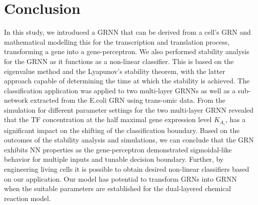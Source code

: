 \documentclass[twocolumn]{biophys-new}
\begin{document}
{{\section*{Conclusion} \label{conclusion}
In this study, we introduced a GRNN that can be derived from a cell's GRN and mathematical modelling this for the transcription and translation process, transforming a gene into a gene-perceptron. We also performed stability analysis for the GRNN as it functions as a non-linear classifier. This is based on the eigenvalue method and the Lyapunov's stability theorem, with the latter approach capable of determining the time at which the stability is achieved. 
The classification application was applied to two multi-layer GRNNs as well as a sub-network extracted from the E.coli GRN using trans-omic data. 
From the simulation for different parameter settings for the two multi-layer GRNN revealed that the TF concentration at the half maximal gene expression level $K_{A_i}$, has a significant impact on the shifting  of the classification boundary.  Based on the outcomes of the stability analysis and simulations, we can conclude that the GRN exhibits NN properties as the gene-perceptron demonstrated sigmoidal-like behavior for multiple inputs and tunable decision boundary. Further, by engineering living cells it is possible to  obtain desired non-linear classifiers based on our application. 
Our model has potential to transform GRNs into GRNN when the suitable parameters are established for the dual-layered chemical
reaction model. %







}}
\end{document}
